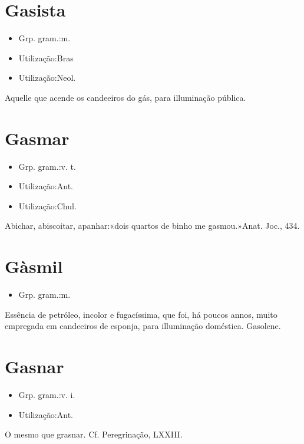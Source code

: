 \section{Gasista}
\begin{itemize}
\item {Grp. gram.:m.}
\end{itemize}
\begin{itemize}
\item {Utilização:Bras}
\end{itemize}
\begin{itemize}
\item {Utilização:Neol.}
\end{itemize}
Aquelle que acende os candeeiros do gás, para illuminação pública.
\section{Gasmar}
\begin{itemize}
\item {Grp. gram.:v. t.}
\end{itemize}
\begin{itemize}
\item {Utilização:Ant.}
\end{itemize}
\begin{itemize}
\item {Utilização:Chul.}
\end{itemize}
Abichar, abiscoitar, apanhar:«\textunderscore dois quartos de binho me gasmou.\textunderscore »\textunderscore Anat. Joc.\textunderscore , 434.
\section{Gàsmil}
\begin{itemize}
\item {Grp. gram.:m.}
\end{itemize}
Essência de petróleo, incolor e fugacíssima, que foi, há poucos annos, muito empregada em candeeiros de esponja, para illuminação doméstica.
Gasolene.
\section{Gasnar}
\begin{itemize}
\item {Grp. gram.:v. i.}
\end{itemize}
\begin{itemize}
\item {Utilização:Ant.}
\end{itemize}
O mesmo que \textunderscore grasnar\textunderscore . Cf. \textunderscore Peregrinação\textunderscore , LXXIII.
